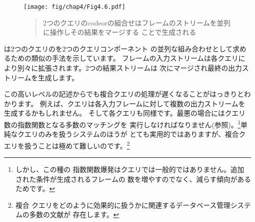 \begin{figure}[tb]
\label{Figure 4.6}
\centering
\begin{comment}
\heading{Figure 4.6:} The \code{or} combination of two queries is produced 
by operating on the stream of frames in parallel and merging the results.

\begin{example}
           +---------------------------+
           |          (or A B)         |
           |    +---+                  |
input      | +->| A |------------+     |  output
stream of  | |  +---+            V     |  stream of
frames     | |    ^          +-------+ |  frames
-------------*    |          | merge +--------------->
           | |    |          +-------+ |
           | |    |              ^     |
           | |    |   +---+      |     |
           | +------->| B +------+     |
           |      |   +---+            |
           |      |     ^              |
           |      |     |              |
           |      +--*--+              |
           +---------|-----------------+
                     |
                 data base
\end{example}
\end{comment}
\texttt{[image: fig/chap4/Fig4.6.pdf]}
\begin{quote}
 2つのクエリのcode{or}の組合せはフレームのストリームを並列に操作しその結果をマージする
ことで生成される
\end{quote}
\end{figure}

\noindent
{}は2つのクエリのを2つのクエリコンポーネント
の並列な組み合わせとして求めるための類似の手法を示しています。
フレームの入力ストリームは各クエリにより別々に拡張されます。2つの結果ストリームは
次にマージされ最終の出力ストリームを生成します。

この高いレベルの記述からでも複合クエリの処理が遅くなることがはっきりとわかります。
例えば、クエリは各入力フレームに対して複数の出力ストリームを生成するかもしれません。
そして各クエリも同様です。最悪の場合にはクエリ数の指数関数となる多数のマッチングを
実行しなければなりません(参照)。\footnote{しかし、この種の
指数関数爆発はクエリでは一般的ではありません。追加された条件が生成されるフレームの
数を増やすのでなく、減らす傾向があるためです。}単純なクエリのみを扱うシステムのほうが
とても実用的ではありますが、複合クエリを扱うことは極めて難しいのです。\footnote{複合
クエリをどのように効果的に扱うかに関連するデータベース管理システムの多数の文献が
存在します。}

